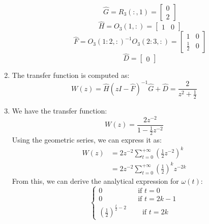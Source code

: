 \begin{enumerate}
\begin{itemize}
                \[\hat{G}=R_3(:,1)=\begin{bmatrix} 0 \\ 2 \end{bmatrix}\]
                \[\hat{H}=O_3(1,:)=\begin{bmatrix} 1 & 0 \end{bmatrix}\]
                \[\hat{F}=O_3(1:2,:)^{-1}O_3(2:3,:)=\begin{bmatrix} 1 & 0 \\ \frac{1}{2} & 0 \end{bmatrix}\]
                \[\hat{D}=\begin{bmatrix} 0 \end{bmatrix}\]
        \end{itemize}
    \item The transfer function is computed as: 
        \[W(z)=\hat{H}\left(zI-\hat{F}\right)^{-1}\hat{G}+\hat{D}=\dfrac{2}{z^2+\frac{1}{2}}\]
    \item We have the transfer function:
        \[W(z)=\dfrac{2z^{-2}}{1-\frac{1}{2}z^{-2}}\]
        Using the geometric series, we can express it as:
        \begin{align*}
            W(z)    &=2z^{-2}\sum_{t=0}^{+\infty}\left(\frac{1}{2}z^{-2}\right)^k \\
                    &=2z^{-2}\sum_{t=0}^{+\infty}\left(\frac{1}{2}\right)^kz^{-2k}
        \end{align*}
        From this, we can derive the analytical expression for $\omega(t)$:
        \[\begin{cases}
            0 \qquad\qquad\quad \text{if }t=0 \\
            0 \qquad\qquad\quad \text{if }t=2k-1 \\
            \left(\frac{1}{2}\right)^{\frac{t}{2}-2}\:\qquad\text{if }t=2k
        \end{cases}\]
\end{enumerate}